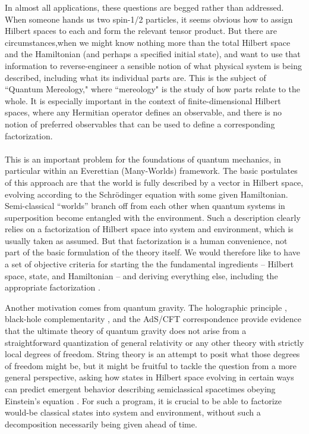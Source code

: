 \documentclass[aps,pra,onecolumn,nofootinbib,11pt,tightenlines]{revtex4-1}
\begin{document}
In almost all applications, these questions are begged rather than addressed.
When someone hands us two spin-1/2 particles, it seems obvious how to assign Hilbert spaces to each and form the relevant tensor product.
But there are circumstances,when we might know nothing more than the total Hilbert space and the Hamiltonian (and perhaps a specified initial state), and want to use that information to reverse-engineer a sensible notion of what physical system is being described, including what its individual parts are.
This is the subject of ``Quantum Mereology," where ``mereology" is the study of how parts relate to the whole.
It is especially important in the context of finite-dimensional Hilbert spaces, where any Hermitian operator defines an observable, and there is no notion of preferred observables that can be used to define a corresponding factorization.
\\
\\
{This is an important problem for the foundations of quantum mechanics, in particular within an Everettian (Many-Worlds) framework.
The basic postulates of this approach are that the world is fully described by a vector in Hilbert space, evolving according to the Schr\"odinger equation with some given Hamiltonian.
Semi-classical ``worlds'' branch off from each other when quantum systems in superposition become entangled with the environment.
Such a description clearly relies on a factorization of Hilbert space into system and environment, which is usually taken as assumed.
But that factorization is a human convenience, not part of the basic formulation of the theory itself.
We would therefore like to have a set of objective criteria for starting the the fundamental ingredients -- Hilbert space, state, and Hamiltonian -- and deriving everything else, including the appropriate factorization \cite{Carroll:2018rhc}.}

{Another motivation comes from quantum gravity.
The holographic principle \cite{Hooft:1993gx,Susskind:1994vu}, black-hole complementarity \cite{Susskind:1993if}, and the AdS/CFT correspondence \cite{Maldacena:1997re} provide evidence that the ultimate theory of quantum gravity does not arise from a straightforward quantization of general relativity or any other theory with strictly local degrees of freedom.
String theory is an attempt to posit what those degrees of freedom might be, but it might be fruitful to tackle the question from a more general perspective, asking how states in Hilbert space evolving in certain ways can predict emergent behavior describing semiclassical spacetimes obeying Einstein's equation \cite{Banks:2011av,Giddings:2015lla,Cao:2016mst,Cao:2017hrv}.
For such a program, it is crucial to be able to factorize would-be classical states into system and environment, without such a decomposition necessarily being given ahead of time.}
\end{document}
